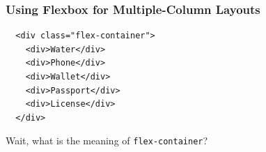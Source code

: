 \documentclass[14pt,aspectratio=169]{beamer}
\begin{document}
%
\begin{frame}[fragile]
  \frametitle{Using Flexbox for Multiple-Column Layouts}
  \normalsize
  \begin{minipage}{6in}
    \vspace*{.2in}
    \begin{verbatim}
  <div class="flex-container">
    <div>Water</div>
    <div>Phone</div>
    <div>Wallet</div>
    <div>Passport</div>
    <div>License</div>
  </div>
    \end{verbatim}
  \end{minipage}
  \vspace*{.05in}
  \begin{center}
    \noindent Wait, what is the meaning of {\tt flex-container}? \\
  \end{center}
\end{frame}
\end{document}
